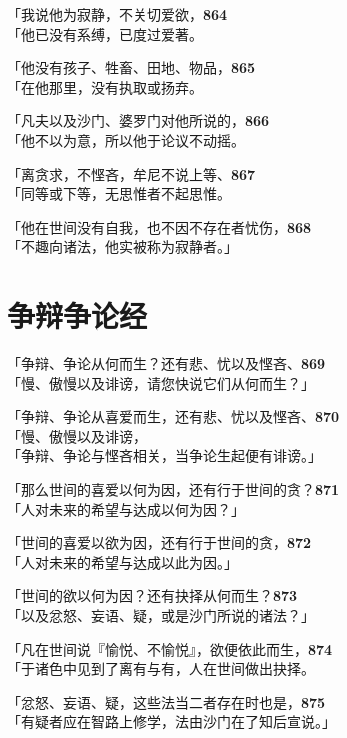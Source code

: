 「我说他为寂静，不关切爱欲，\hfill{\grayfootnotesize \textbf{864}} \\
「他已没有系缚，已度过爱著。


「他没有孩子、牲畜、田地、物品，\hfill{\grayfootnotesize \textbf{865}} \\
「在他那里，没有执取或扬弃。


「凡夫以及沙门、婆罗门对他所说的，\hfill{\grayfootnotesize \textbf{866}} \\
「他不以为意，所以他于论议不动摇。


「离贪求，不悭吝，牟尼不说上等、\hfill{\grayfootnotesize \textbf{867}} \\
「同等或下等，无思惟者不起思惟。


「他在世间没有自我，也不因不存在者忧伤，\hfill{\grayfootnotesize \textbf{868}} \\
「不趣向诸法，他实被称为寂静者。」


\section{争辩争论经}


「争辩、争论从何而生？还有悲、忧以及悭吝、\hfill{\grayfootnotesize \textbf{869}} \\
「慢、傲慢以及诽谤，请您快说它们从何而生？」


「争辩、争论从喜爱而生，还有悲、忧以及悭吝、\hfill{\grayfootnotesize \textbf{870}} \\
「慢、傲慢以及诽谤，\\
「争辩、争论与悭吝相关，当争论生起便有诽谤。」


「那么世间的喜爱以何为因，还有行于世间的贪？\hfill{\grayfootnotesize \textbf{871}} \\
「人对未来的希望与达成以何为因？」


「世间的喜爱以欲为因，还有行于世间的贪，\hfill{\grayfootnotesize \textbf{872}} \\
「人对未来的希望与达成以此为因。」


「世间的欲以何为因？还有抉择从何而生？\hfill{\grayfootnotesize \textbf{873}} \\
「以及忿怒、妄语、疑，或是沙门所说的诸法？」


「凡在世间说『愉悦、不愉悦』，欲便依此而生，\hfill{\grayfootnotesize \textbf{874}} \\
「于诸色中见到了离有与有，人在世间做出抉择。


「忿怒、妄语、疑，这些法当二者存在时也是，\hfill{\grayfootnotesize \textbf{875}} \\
「有疑者应在智路上修学，法由沙门在了知后宣说。」


